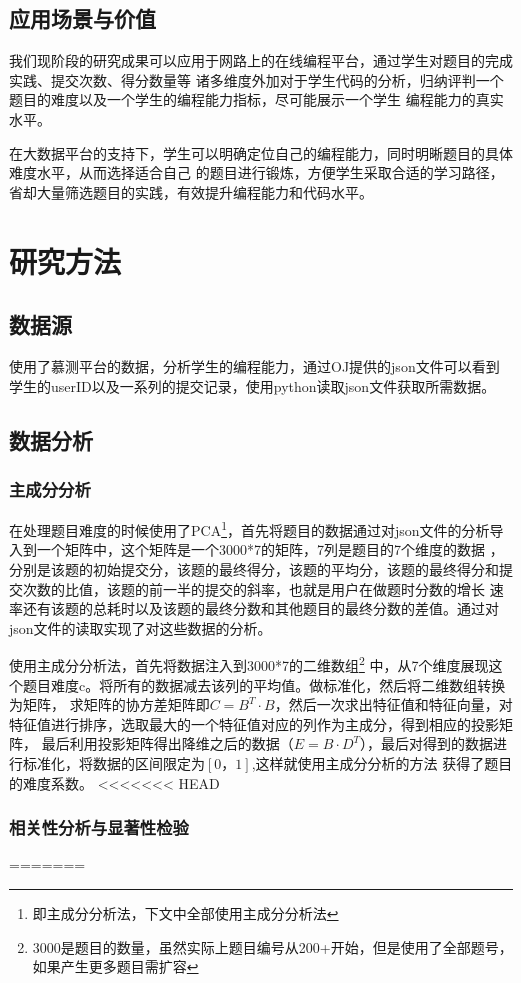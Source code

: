 \documentclass[UTF8]{ctexart}
\begin{document}
\subsection{应用场景与价值}
我们现阶段的研究成果可以应用于网路上的在线编程平台，通过学生对题目的完成实践、提交次数、得分数量等
诸多维度外加对于学生代码的分析，归纳评判一个题目的难度以及一个学生的编程能力指标，尽可能展示一个学生
编程能力的真实水平。

在大数据平台的支持下，学生可以明确定位自己的编程能力，同时明晰题目的具体难度水平，从而选择适合自己
的题目进行锻炼，方便学生采取合适的学习路径，省却大量筛选题目的实践，有效提升编程能力和代码水平。
\section{研究方法}
\subsection{数据源}
使用了慕测平台的数据，分析学生的编程能力，通过OJ提供的json文件可以看到学生的userID以及一系列的提交记录，使用python读取json文件获取所需数据。
\subsection{数据分析}
\subsubsection{主成分分析}
在处理题目难度的时候使用了PCA\footnote{即主成分分析法，下文中全部使用主成分分析法}，首先将题目的数据通过对json文件的分析导入到一个矩阵中，这个矩阵是一个3000*7的矩阵，7列是题目的7个维度的数据
，分别是该题的初始提交分，该题的最终得分，该题的平均分，该题的最终得分和提交次数的比值，该题的前一半的提交的斜率，也就是用户在做题时分数的增长
速率还有该题的总耗时以及该题的最终分数和其他题目的最终分数的差值。通过对json文件的读取实现了对这些数据的分析。

使用主成分分析法，首先将数据注入到3000*7的二维数组\footnote{3000是题目的数量，虽然实际上题目编号从200+开始，但是使用了全部题号，如果产生更多题目需扩容}
中，从7个维度展现这个题目难度c。将所有的数据减去该列的平均值。做标准化，然后将二维数组转换为矩阵，
求矩阵的协方差矩阵即$C=B^T \cdot B$，然后一次求出特征值和特征向量，对特征值进行排序，选取最大的一个特征值对应的列作为主成分，得到相应的投影矩阵，
最后利用投影矩阵得出降维之后的数据（$E = B \cdot D^T$），最后对得到的数据进行标准化，将数据的区间限定为$[0，1]$,这样就使用主成分分析的方法
获得了题目的难度系数。
<<<<<<< HEAD
\subsubsection{相关性分析与显著性检验}
=======
\end{document}
